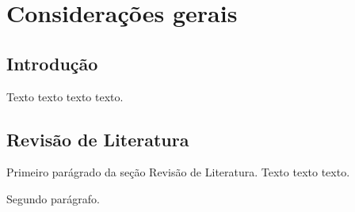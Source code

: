 \chapter{Considerações gerais}
\section{Introdução}

Texto texto texto texto.

\section{Revisão de Literatura}

Primeiro parágrado da seção Revisão de Literatura. Texto texto texto.

Segundo parágrafo.


